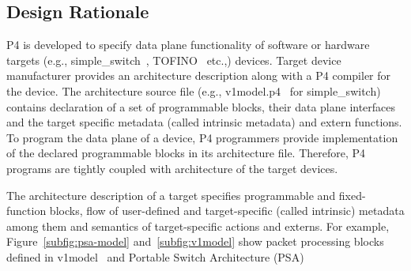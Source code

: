 \documentclass[10pt,sigconf,letterpaper,anonymous]{acmart}
\begin{document}
\subsection{Design Rationale}
P4 is developed to specify data plane functionality of software or hardware targets (e.g., simple\_\-switch~\cite{simple_switch.md}, TOFINO~\cite{tofino} etc.,) devices.
Target device manufacturer provides an architecture description along with a P4 compiler for the device.
The architecture source file (e.g., v1model.p4~\cite{v1model.p4} for simple\_switch) contains declaration of a set of pro\-gram\-ma\-ble blocks, their data plane interfaces and the target specific metadata (called intrinsic metadata) and extern functions.
To program the data plane of a device, P4 programmers provide implementation of the declared programmable blocks in its architecture file.
Therefore, P4 programs are tightly coupled with architecture of the target devices.


The architecture description of a target specifies pro\-gram\-ma\-ble and fixed-function blocks, flow of user-defined and target-specific (called intrinsic) metadata among them and semantics of target-specific actions and externs.
For example, Figure~\ref{subfig:psa-model} and~\ref{subfig:v1model} show packet processing blocks defined in v1model~\cite{simple_switch.md} and Portable Switch Architecture (PSA)~\cite{psa}
\end{document}

